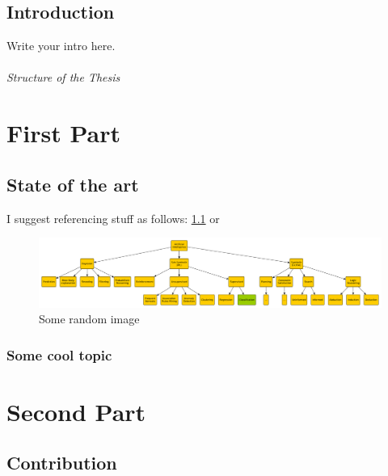 \documentclass[12pt,a4paper,openright,twoside]{book}
\begin{document}
\mainmatter

\chapter{Introduction}
\label{chap:introduction}

Write your intro here.

\paragraph{Structure of the Thesis}


\part{First Part}

\chapter{State of the art}

I suggest referencing stuff as follows: \cref{fig:random-image} or 

\begin{figure}
    \centering
    \includegraphics[width=.8\linewidth]{figures/random-image.pdf}
    \caption{Some random image}
    \label{fig:random-image}
\end{figure}

\section{Some cool topic}

\part{Second Part}

\chapter{Contribution}
\end{document}
